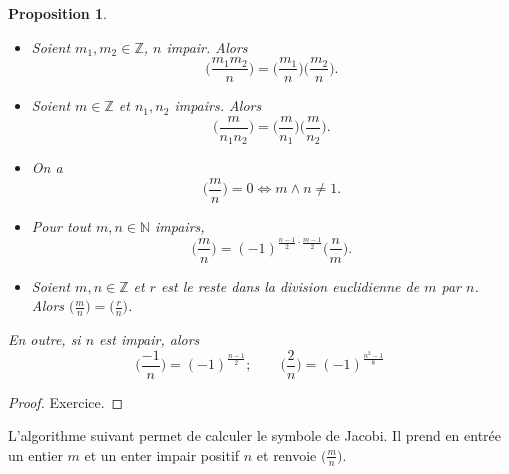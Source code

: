 \documentclass[12pt]{report}
\newtheorem{Prop}[thm]{Proposition}
\newcommand{\Z}{\mathbb{Z}}
\begin{document}
\begin{Prop}\
\begin{itemize}
\item[$1)$] Soient $m_1,m_2 \in \mathbb{Z}$, $n$ impair. Alors $$\Big(  \frac{m_1 m_2}{n}\Big)= \Big(  \frac{m_1}{n}\Big) \Big(  \frac{m_2}{n}\Big). $$
\item[$2)$] Soient $m \in \mathbb{Z}$ et $n_1,n_2$ impairs. Alors 
$$    \Big(  \frac{m}{n_1 n_2}\Big)= \Big(  \frac{m}{n_1}\Big)\Big(  \frac{m}{n_2}\Big) .  $$
\item[$3)$] On a
$$     \Big(  \frac{m}{n}\Big)=0 \Longleftrightarrow m\wedge n \neq 1    .$$
\item[$4)$] Pour tout $m,n \in \mathbb{N}$ impairs, 
$$   \Big(  \frac{m}{n}\Big)= (-1)^{\tfrac{n-1}{2}\cdot \tfrac{m-1}{2} } \Big(  \frac{n}{m}\Big) .   $$

\item Soient $m,n\in \Z$ et  $r$ est le reste dans la division euclidienne de $m$ par $n$. Alors $\big(\frac{m}{n}\big)=\big(\frac{r}{n}\big)$. 
\end{itemize}
En outre, si $n$ est impair, alors 
$$   \Big(  \frac{-1}{n}\Big)= (-1)^{\tfrac{n-1}{2}} ; \qquad  \Big(  \frac{2}{n}\Big)= (-1)^{\tfrac{n^2-1}{8}}  $$    
\end{Prop}

\begin{proof}
Exercice.
\end{proof}


L'algorithme suivant permet de calculer le symbole de Jacobi. Il prend en entrée un entier $m$ et un enter impair positif $n$ et renvoie $ \big( \tfrac{m}{n} \big)$.\\
\end{document}

